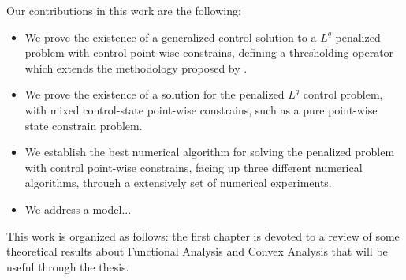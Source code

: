 Our contributions in this work are the following:

\begin{itemize}
    \item We prove the existence of a generalized control solution to a $L^q$ penalized problem with control point-wise constrains, defining a thresholding operator which extends the methodology proposed by \cite{ito-kunisch2014}.
    \item  We prove the existence of a solution for the penalized $L^q$ control problem, with mixed control-state point-wise constrains, such as a pure point-wise state constrain problem.
    \item We establish the best numerical algorithm for solving the penalized problem with control point-wise constrains, facing up three different numerical algorithms, through a extensively set of numerical experiments.
    \item We address a model...
\end{itemize}

This work is organized as follows: the first chapter is devoted to a review of some theoretical results about Functional Analysis and Convex Analysis that will be useful through the thesis. 

